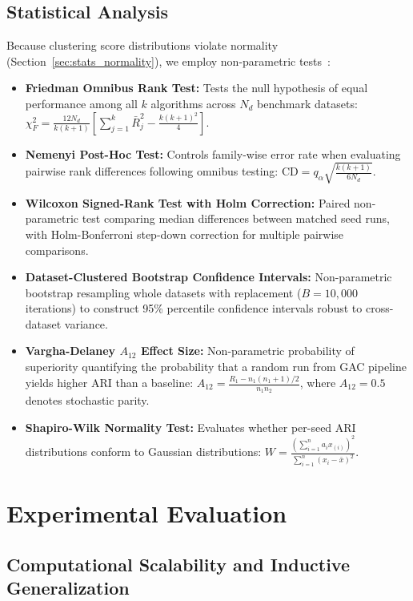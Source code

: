 \documentclass[pdflatex,sn-mathphys-num]{sn-jnl}
\theoremstyle{thmstyleone}
\theoremstyle{thmstyletwo}
\theoremstyle{thmstylethree}
\begin{document}
\subsection{Statistical Analysis}\label{sec:setup_stats}
Because clustering score distributions violate normality (Section~\ref{sec:stats_normality}), we employ non-parametric tests~\cite{demsar2006statistical,wang2026deep_jasa}:
\begin{itemize}
 \item \textbf{Friedman Omnibus Rank Test:} Tests the null hypothesis of equal performance among all $k$ algorithms across $N_d$ benchmark datasets: $\chi_F^2 = \frac{12 N_d}{k(k+1)} \left[\sum_{j=1}^k \bar{R}_j^2 - \frac{k(k+1)^2}{4}\right]$.
 \item \textbf{Nemenyi Post-Hoc Test:} Controls family-wise error rate when evaluating pairwise rank differences following omnibus testing: $\text{CD} = q_\alpha \sqrt{\frac{k(k+1)}{6 N_d}}$.
 \item \textbf{Wilcoxon Signed-Rank Test with Holm Correction:} Paired non-parametric test comparing median differences between matched seed runs, with Holm-Bonferroni step-down correction for multiple pairwise comparisons.
 \item \textbf{Dataset-Clustered Bootstrap Confidence Intervals:} Non-parametric bootstrap resampling whole datasets with replacement ($B = 10{,}000$ iterations) to construct 95\% percentile confidence intervals robust to cross-dataset variance.
 \item \textbf{Vargha-Delaney $A_{12}$ Effect Size:} Non-parametric probability of superiority quantifying the probability that a random run from GAC pipeline yields higher ARI than a baseline: $A_{12} = \frac{R_1 - n_1(n_1+1)/2}{n_1 n_2}$, where $A_{12} = 0.5$ denotes stochastic parity.
 \item \textbf{Shapiro-Wilk Normality Test:} Evaluates whether per-seed ARI distributions conform to Gaussian distributions: $W = \frac{(\sum_{i=1}^n a_i x_{(i)})^2}{\sum_{i=1}^n (x_i - \bar{x})^2}$.
\end{itemize}


\section{Experimental Evaluation}\label{sec:evaluation}

\subsection{Computational Scalability and Inductive Generalization}\label{sec:scalability}
\end{document}
